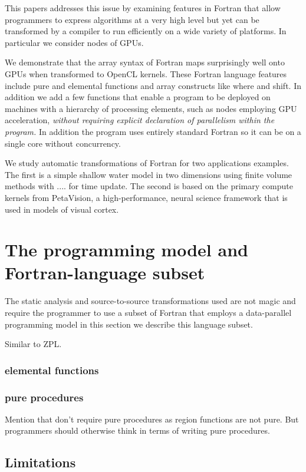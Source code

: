 This papers addresses this issue by examining features in Fortran that
allow programmers to express algorithms at a very high level but yet
can be transformed by a compiler to run efficiently on a wide variety
of platforms.  In particular we consider nodes of GPUs.

We demonstrate that the array syntax of Fortran maps surprisingly well
onto GPUs when transformed to OpenCL kernels.  These Fortran language
features include pure and elemental functions and array constructs
like where and shift.  In addition we add a few functions that enable
a program to be deployed on machines with a hierarchy of processing elements,
such as nodes employing GPU acceleration,
\emph{without requiring explicit declaration of parallelism within the program.}
In addition the program uses entirely standard Fortran so it can be
on a single core without concurrency.

We study automatic transformations of Fortran for two applications examples.
The first is a simple shallow water model in two dimensions using
finite volume methods with .... for time update.  The second is based
on the primary compute kernels from PetaVision, a high-performance, 
neural science framework that is used in models of visual cortex.


\section{The programming model and Fortran-language subset}

The static analysis and source-to-source transformations used are not magic
and require the programmer to use a subset of Fortran that employs
a data-parallel programming model in this section we describe this
language subset.

Similar to ZPL.

\subsubsection{elemental functions}

\subsubsection{pure procedures}

Mention that don't require pure procedures as region functions are not pure.
But programmers should otherwise think in terms of writing pure procedures.

\subsection{Limitations}

